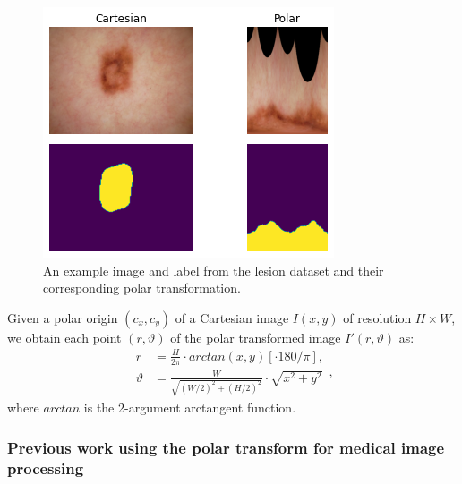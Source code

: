 	\begin{figure}[t!]
		\centering
		\includegraphics[width=0.4\linewidth]{images/4/to_polar}
		\caption{An example image and label from the lesion dataset and their corresponding polar transformation. \cite{bencevicTrainingPolarImage2021}}
		\label{fig:polar-lesion}
	\end{figure}

Given a polar origin $(c_x, c_y)$ of a Cartesian image $I(x, y)$ of resolution $H \times W$, we obtain each point $(r, \vartheta)$ of the polar transformed image $I'(r, \vartheta)$ as:
  \begin{equation}
    \begin{aligned}
      r &= \frac{H}{2 \pi} \cdot arctan(x, y) [ \cdot 180 / \pi ], \\
      \vartheta &= \frac{W}{\sqrt{(W / 2)^2 + (H / 2)^2}} \cdot \sqrt{x^2 + y^2}
    \end{aligned},
    \label{eq:polar-transform}
  \end{equation}
  where $arctan$ is the 2-argument arctangent function.

    \subsubsection{Previous work using the polar transform for medical image processing}
    
